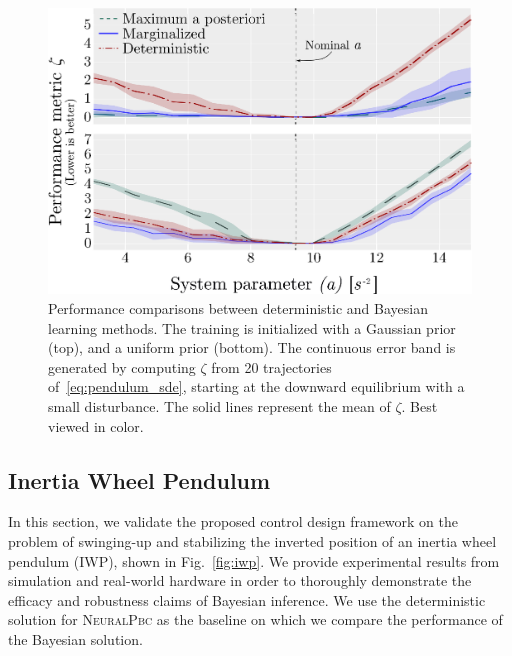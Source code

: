 \begin{figure}[tb]
    \centering
    \includegraphics[width=0.8\linewidth]{figures/H_combined.eps}
    \caption{
        Performance comparisons between deterministic and Bayesian learning
        methods. 
        The training is initialized with a Gaussian prior (top), and a
        uniform prior (bottom). 
        The continuous error band is generated by computing $\zeta$ from 20
        trajectories of~\eqref{eq:pendulum_sde}, starting at the downward
        equilibrium with a small disturbance. 
        The solid lines represent the mean of $\zeta$. 
        Best viewed in color.
    }
    \label{fig:bayes_compare}
\end{figure}
\subsection{Inertia Wheel Pendulum}
\label{subsec:iwp}
In this section, we validate the proposed control design framework on the
problem of swinging-up and stabilizing the inverted position of an inertia wheel
pendulum (IWP), shown in Fig.~\ref{fig:iwp}. We provide experimental results
from simulation and real-world hardware in order to thoroughly demonstrate the
efficacy and robustness claims of Bayesian inference. 
%
We use the deterministic solution for \textsc{NeuralPbc} as the baseline on
which we compare the performance of the Bayesian solution. 

